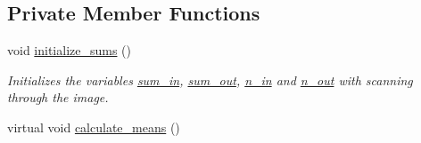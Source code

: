 \subsection*{Private Member Functions}
\begin{DoxyCompactItemize}
\item 
\hypertarget{classofeli_1_1_a_cwithout_edges_a39c8f6940d7574aadec3953b4704e8af}{void \hyperlink{classofeli_1_1_a_cwithout_edges_a39c8f6940d7574aadec3953b4704e8af}{initialize\-\_\-sums} ()}\label{classofeli_1_1_a_cwithout_edges_a39c8f6940d7574aadec3953b4704e8af}

\begin{DoxyCompactList}\small\item\em Initializes the variables \hyperlink{classofeli_1_1_a_cwithout_edges_a14f61eabccbac71bf616674e8feb44f5}{sum\-\_\-in}, \hyperlink{classofeli_1_1_a_cwithout_edges_a799b4078bc22cbde48cc29c93727efc5}{sum\-\_\-out}, \hyperlink{classofeli_1_1_a_cwithout_edges_a8d2c28710176ae9b562b4001f8171348}{n\-\_\-in} and \hyperlink{classofeli_1_1_a_cwithout_edges_a07818e5c3700b0164037e982077de10c}{n\-\_\-out} with scanning through the image. \end{DoxyCompactList}\item 
\hypertarget{classofeli_1_1_a_cwithout_edges_a6dd4cde332938ec033cb8a5e870ec132}{virtual void \hyperlink{classofeli_1_1_a_cwithout_edges_a6dd4cde332938ec033cb8a5e870ec132}{calculate\-\_\-means} ()}\label{classofeli_1_1_a_cwithout_edges_a6dd4cde332938ec033cb8a5e870ec132}


\end{DoxyCompactItemize}
